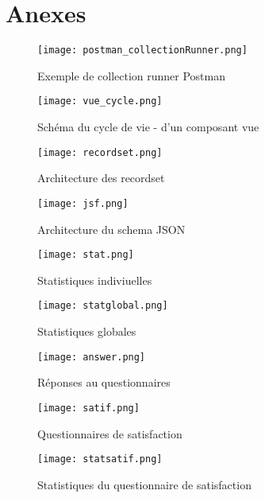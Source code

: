 \section{Anexes}

\begin{figure}[htbp]
    \center
    \texttt{[image: postman\_collectionRunner.png]}
    \caption{Exemple de collection runner Postman}
    \label{fig:postman_collectionRunner}
\end{figure}

\begin{figure}[htbp]
    \center
    \texttt{[image: vue\_cycle.png]}
    \caption{Schéma du cycle de vie - d'un composant vue\cite{vuelifecycle}}
    \label{fig:vue_cycle}
\end{figure}
    
\begin{figure}[htbp]
    \center 
    \texttt{[image: recordset.png]}
    \label{fig:recordset}
    \caption{Architecture des recordset}
\end{figure}
\begin{figure}[htbp]
    \center 
    \texttt{[image: jsf.png]}
    \caption{Architecture du schema JSON}
    \label{fig:jsf}
\end{figure}


\begin{figure}[htbp]
    \center 
    \texttt{[image: stat.png]}
    \caption{Statistiques indiviuelles}
    \label{fig:statindi}
\end{figure}

\begin{figure}[htbp]
    \center 
    \texttt{[image: statglobal.png]}
    \caption{Statistiques globales}
    \label{fig:statglobal}
\end{figure}

\begin{figure}[htbp]
    \center 
    \texttt{[image: answer.png]}
    \caption{Réponses au questionnaires}
    \label{fig:answer}
\end{figure}

\begin{figure}[htbp]
    \center 
    \texttt{[image: satif.png]}
    \caption{Questionnaires de satisfaction}
    \label{fig:satisfaction}
\end{figure}

\begin{figure}[htbp]
    \center 
    \texttt{[image: statsatif.png]}
    \caption{Statistiques du questionnaire de satisfaction}
    \label{fig:satisfactionStat}
\end{figure}


